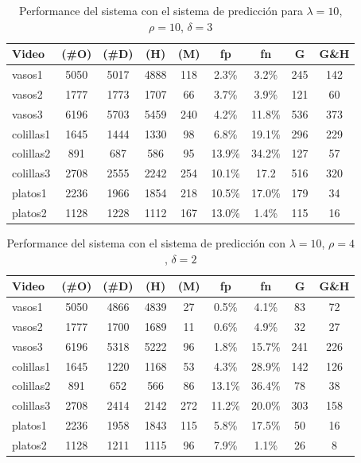 \begin{table}[htb]
\begin{center}
  \begin{tabular}{|l | c | c | c | c | c | c | c | c |}
	\hline  
	\textbf{Video} & \textbf{(\#O)} &  \textbf{(\#D)} & \textbf{(H)} & \textbf{(M)} & \textbf{fp} & \textbf{fn} & \textbf{G} & \textbf{G\&H} \\
	\hline
	\hline
	vasos1 & 5050 & 5017 & 4888 & 118 & 2.3\% & 3.2\%  & 245 & 142\\
	vasos2 & 1777 & 1773 & 1707 & 66 & 3.7\% & 3.9\% & 121 & 60 \\
	vasos3 & 6196 & 5703 & 5459 & 240 & 4.2\% & 11.8\% & 536 & 373 \\
	\hline
	colillas1 & 1645 & 1444 & 1330 & 98 & 6.8\% & 19.1\% & 296 & 229 \\
	colillas2 & 891 & 687 & 586 & 95 & 13.9\% & 34.2\% & 127 & 57 \\
	colillas3 & 2708 & 2555 & 2242 & 254 & 10.1\% & 17.2  & 516 & 320\\
	\hline
	platos1 & 2236 & 1966 & 1854 & 218 & 10.5\% & 17.0\% & 179 & 34\\
	platos2 & 1128 & 1228 & 1112 & 167& 13.0\% & 1.4\% & 115 & 16\\
	\hline
	\end{tabular}
	\caption[Performance con sistema de predicci\'on configuraci\'on 1]{\label{tab:pred} Performance del sistema con el sistema de predicci\'on para 
	$\lambda=10$, $\rho=10$, $\delta=3$ }
	\end{center}
\end{table}

\begin{table}[htb]
\begin{center}
  \begin{tabular}{|l | c | c | c | c | c | c | c | c |}
	\hline  
	\textbf{Video} & \textbf{(\#O)} &  \textbf{(\#D)} & \textbf{(H)} & \textbf{(M)} & \textbf{fp} & \textbf{fn} & \textbf{G} & \textbf{G\&H} \\
	\hline
	\hline
	vasos1 & 5050 & 4866 & 4839 & 27 & 0.5\% & 4.1\%  & 83 & 72\\
	vasos2 & 1777 & 1700 & 1689 & 11 & 0.6\% & 4.9\% & 32 & 27 \\
	vasos3 & 6196 & 5318 & 5222 & 96 & 1.8\% & 15.7\% & 241 & 226 \\
	\hline
	colillas1 & 1645 & 1220 & 1168 & 53 & 4.3\% & 28.9\% & 142 & 126 \\
	colillas2 & 891 & 652 & 566 & 86 & 13.1\% & 36.4\% & 78 & 38 \\
	colillas3 & 2708 & 2414 & 2142 & 272 & 11.2\% & 20.0\% & 303 & 158 \\
	\hline
	platos1 & 2236 & 1958 & 1843 & 115 & 5.8\% & 17.5\% & 50 & 16 \\
	platos2 & 1128 & 1211 & 1115 & 96 & 7.9\% & 1.1\% & 26 & 8 \\
	\hline
	\end{tabular}
	\caption[Performance con sistema de predicci\'on configuraci\'on 2]{\label{tab:pred_2} Performance del sistema con el sistema de predicci\'on con
	$\lambda=10$, $\rho=4$, $\delta=2$}
	\end{center}
\end{table}

